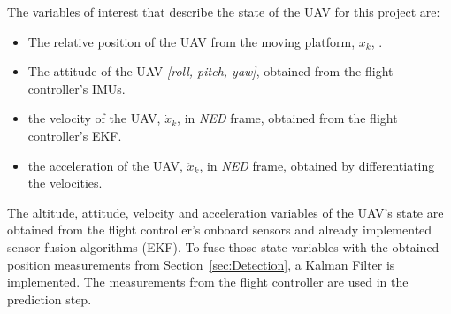 \documentclass[conference, onecolumn, draftclsnofoot]{IEEEtran}
\begin{document}
The variables of interest that describe the state of the UAV for this project are:
%
\begin{itemize}

\item The relative position of the UAV from the moving platform, 
$x_k$, 
.



\item The attitude of the UAV \emph{[roll, pitch, yaw]}, obtained from the flight controller's IMUs.

\item the velocity of the UAV, $\dot{x}_k$, in \emph{NED} frame, obtained from 
the flight controller's EKF.


\item the acceleration of the UAV, $\ddot{x}_k$, in \emph{NED} frame, obtained by differentiating the velocities.





\end{itemize}
%
The altitude, attitude, velocity and acceleration variables of the
UAV's state are obtained from the flight controller's onboard sensors
and already implemented sensor fusion algorithms (EKF). To fuse those
state variables with the obtained position measurements from
Section~\ref{sec:Detection}, a Kalman Filter is implemented. The
measurements from the flight controller are used in the prediction
step.
\end{document}
